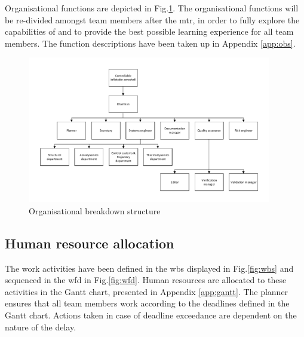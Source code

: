 Organisational functions are depicted in Fig.\ref{fig:obs}. The organisational functions will be re-divided amongst team members after the \gls{mtr}, in order to fully explore the capabilities of and to provide the best possible learning experience for all team members. The function descriptions have been taken up in Appendix \ref{app:obs}.

\begin{figure}[H]
\centering
\includegraphics[width=0.95\textwidth]{./Figure/OBS_MTR.pdf}
\caption{Organisational breakdown structure} \label{fig:OBS}
\label{fig:obs}
\end{figure}

\subsection{Human resource allocation}
\label{sec:gantt}
The work activities have been defined in the \gls{wbs} displayed in Fig.\ref{fig:wbs} and sequenced in the \gls{wfd} in Fig.\ref{fig:wfd}. Human resources are allocated to these activities in the Gantt chart, presented in Appendix \ref{app:gantt}. The planner ensures that all team members work according to the deadlines defined in the Gantt chart. Actions taken in case of deadline exceedance are dependent on the nature of the delay.
